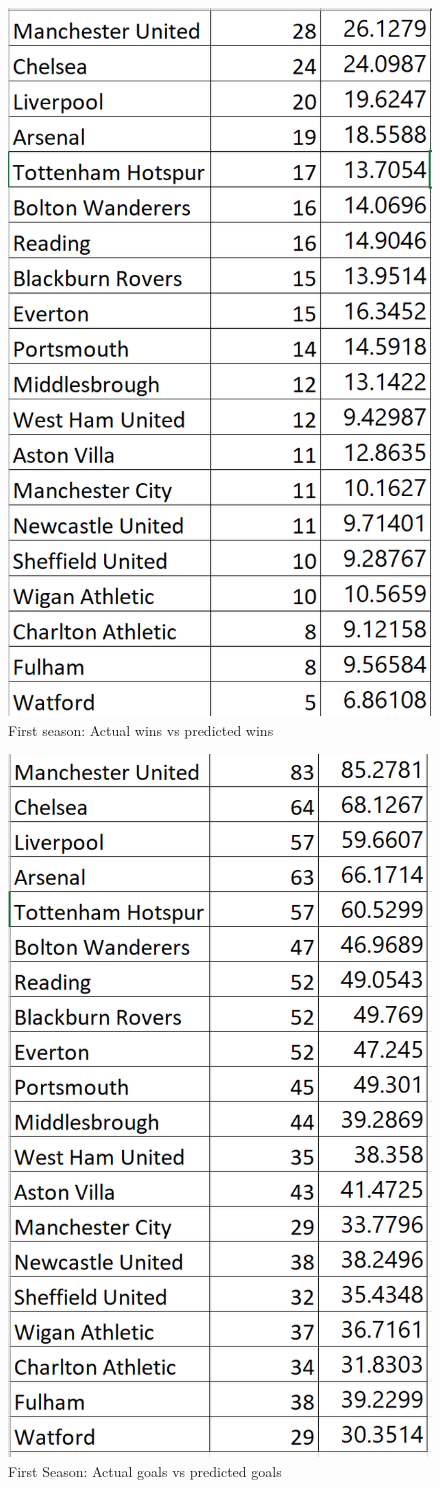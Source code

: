 \documentclass[12pt,english]{article}
\begin{document}
\begin{figure}[ht]
\centering
\bigskip{}
\includegraphics[width=.7\linewidth]{Pred Wins.PNG}
\caption{First season: Actual wins vs predicted wins}
\label{fig:fig1}
\end{figure}

\begin{figure}[ht]
\centering
\bigskip{}
\includegraphics[width=.7\linewidth]{Pred Goals.PNG}
\caption{First Season: Actual goals vs predicted goals}
\label{fig:fig1}
\end{figure}



\end{document}
